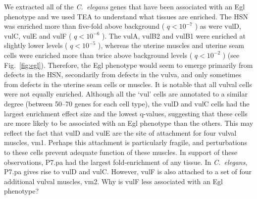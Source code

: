 \documentclass[10pt,letterpaper,twocolumn]{article}
\newcommand{\cel}{\emph{C.~elegans}}
\newcommand{\qval}[1]{
                      \ensuremath{
                                  q<10^{-#1}
                                  }
                      }
\begin{document}
We extracted all of the \cel{} genes that have been associated with an Egl
phenotype and we used TEA to understand what tissues are enriched. The HSN
was enriched more than five-fold above background (\qval{7}) as were vulD, vulC,
vulE and vulF (\qval{6}). The vulA, vulB2 and vulB1 were
enriched at slightly lower levels (\qval{5}), whereas the uterine muscles and
uterine seam cells were enriched more than twice above background levels
(\qval{2}) (see Fig.~\ref{fig:egl}).
Therefore, the Egl phenotype would seem to emerge primarily from defects in the
HSN, secondarily from defects in the vulva, and only sometimes from defects in the
uterine seam cells or muscles. It is notable that all vulval cells were not equally
enriched. Although all the `vul' cells are annotated to a similar degree (between
50--70 genes for each cell type), the vulD and vulC cells had the largest
enrichment effect size and the lowest q-values, suggesting that these cells
are more likely to be associated with an Egl phenotype than the others. This may
reflect the fact that vulD and vulE are the site of attachment for four vulval
muscles, vm1. Perhaps this attachment is particularly fragile, and perturbations
to these cells prevent adequate function of these muscles. In support of these
observations, P7.pa had the largest fold-enrichment of any tissue. In \cel{},
P7.pa gives rise to vulD and vulC. However, vulF is
also attached to a set of four additional vulval muscles, vm2. Why
is vulF less associated with an Egl phenotype?
\end{document}
